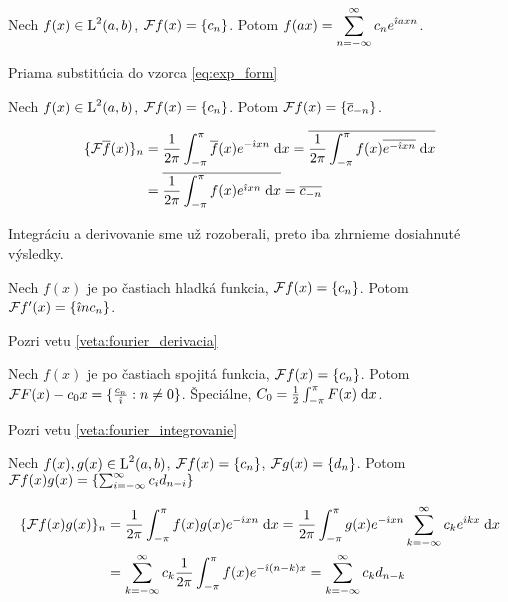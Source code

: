\begin{veta}
Nech $f(x) \in \mbox{L}^2(a,b)$, $\mathcal{F}{f(x)} = \{c_n\}$. Potom
$\displaystyle f(a x) = \sum_{n=-\infty}^{\infty} c_n e^{\hat{\imath} a x n}$.
\end{veta}
\begin{dokaz}
Priama substitúcia do vzorca \eqref{eq:exp_form}
\end{dokaz}


\begin{veta}[Konjugácia]
Nech $f(x) \in \mbox{L}^2(a,b)$, $\mathcal{F}{f(x)} = \{c_n\}$. Potom
$\mathcal{F} f(x) = \{ \overline{c}_{-n} \}$.
\end{veta}
\begin{dokaz}
    \begin{equation*}
    \begin{split}
      \{\mathcal{F} \overline{f}(x)\}_n &= 
        \frac{1}{2\pi} \int_{-\pi}^{\pi} \overline{f}(x) e^{-\hat{\imath} x n} \; \mathrm{d} x 
        = \overline{  \frac{1}{2\pi} \int_{-\pi}^{\pi} f(x) \overline{e^{-\hat{\imath} x n}}
            \; \mathrm{d} x} \\
        &= \overline{  \frac{1}{2\pi} \int_{-\pi}^{\pi} f(x) e^{\hat{\imath} x n}
            \; \mathrm{d} x} 
        = \overline{c_{-n}}
    \end{split}
    \end{equation*}
\end{dokaz}

Integráciu a derivovanie sme už rozoberali, preto iba zhrnieme
dosiahnuté výsledky.
\begin{veta}[O derivovaní]
Nech $f(x)$ je po častiach hladká funkcia, $\mathcal{F}{f(x)} =
\{c_n\}$. Potom $\mathcal{F}{f'(x)} = \{ \hat{\imath} n c_n \}$.
\end{veta}
\begin{dokaz}
    Pozri vetu \ref{veta:fourier_derivacia}
\end{dokaz}

\begin{veta}[O integrovaní]
Nech $f(x)$ je po častiach spojitá funkcia, $\mathcal{F}{f(x)} =
\{c_n\}$. Potom $\mathcal{F}{F(x)-c_0 x} = \{ \frac{c_n}{\hat{\imath}} : n\not=0\}$.
Špeciálne, $C_0 = \frac{1}{2} \int_{-\pi}^{\pi} F(x) \; \mathrm{d} x$.
\end{veta}
\begin{dokaz}
    Pozri vetu \ref{veta:fourier_integrovanie}
\end{dokaz}

\begin{veta}[O modulácii]
Nech $f(x),g(x) \in \mbox{L}^2(a,b)$, $\mathcal{F}{f(x)} = \{c_n\}$,
$\mathcal{F}{g(x)} = \{d_n\}$. Potom
$\mathcal{F} f(x)g(x) = \{ \sum_{i=-\infty}^{\infty} c_i d_{n-i} \}$
\end{veta}
\begin{dokaz}
    \begin{equation*}
    \begin{split}
      \{\mathcal{F} f(x)g(x)\}_n &= 
        \frac{1}{2\pi} \int_{-\pi}^{\pi} f(x)g(x) e^{-\hat{\imath} x n} \; \mathrm{d} x 
        = \frac{1}{2\pi} \int_{-\pi}^{\pi} g(x) e^{-\hat{\imath} x n} \sum_{k=-\infty}^{\infty} c_k
        e^{\hat{\imath} k x} \; \mathrm{d} x \\
        &= \sum_{k=-\infty}^{\infty} c_k \frac{1}{2\pi} \int_{-\pi}^{\pi} f(x) e^{-\hat{\imath} (n-k)
        x}
        = \sum_{k=-\infty}^{\infty} c_k d_{n-k}
    \end{split}
    \end{equation*}
\end{dokaz}

